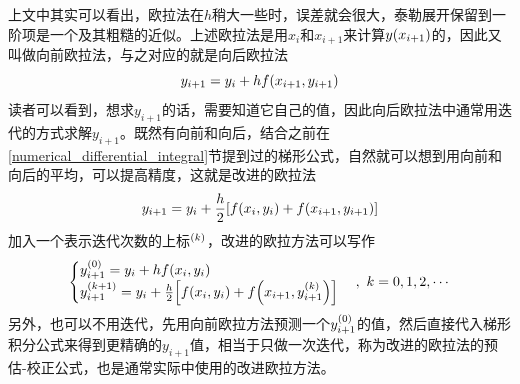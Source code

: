 \documentclass[12pt,a4paper,openany,twoside]{book}
\numberwithin{equation}{section}
\begin{document}
            上文中其实可以看出，欧拉法在$h$稍大一些时，误差就会很大，泰勒展开保留到一阶项是一个及其粗糙的近似。上述欧拉法是用$x_i$和$x_{i+1}$来计算$y\qty(x_{i+1})$的，因此又叫做向前欧拉法，与之对应的就是向后欧拉法
            \begin{equation}
              y_{i+1}=y_i+hf\qty(x_{i+1}, y_{i+1})
            \end{equation}
            读者可以看到，想求$y_{i+1}$的话，需要知道它自己的值，因此向后欧拉法中通常用迭代的方式求解$y_{i+1}$。既然有向前和向后，结合之前在\ref{numerical_differential_integral}节提到过的梯形公式，自然就可以想到用向前和向后的平均，可以提高精度，这就是改进的欧拉法
            \begin{equation*}
              y_{i+1}=y_i+\frac{h}{2}\qty[f\qty(x_i,y_i)+f\qty(x_{i+1},y_{i+1})]
            \end{equation*}
            加入一个表示迭代次数的上标$^\qty(k)$，改进的欧拉方法可以写作
            \begin{equation}
              \begin{cases}
                y_{i+1}^\qty(0)=y_i+hf\qty(x_i,y_i)\\
                y_{i+1}^\qty(k+1)=y_i+\frac{h}{2}\qty[f\qty(x_i,y_i)+f\qty(x_{i+1},y_{i+1}^\qty(k))]
              \end{cases},\ k=0,1,2,\cdots
            \end{equation}
            另外，也可以不用迭代，先用向前欧拉方法预测一个$y_{i+1}^\qty(0)$的值，然后直接代入梯形积分公式来得到更精确的$y_{i+1}$值，相当于只做一次迭代，称为改进的欧拉法的预估-校正公式，也是通常实际中使用的改进欧拉方法。
\end{document}
